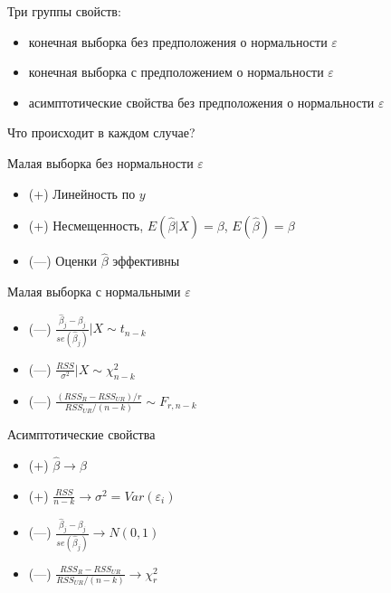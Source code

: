 \documentclass[ignorenonframetext,]{beamer}
\newcommand{\e}{\varepsilon}
\begin{document}
\begin{frame}{Три группы свойств:}

\begin{itemize}
\item
  конечная выборка без предположения о нормальности \(\varepsilon\)
\item
  конечная выборка с предположением о нормальности \(\varepsilon\)
\item
  асимптотические свойства без предположения о нормальности
  \(\varepsilon\)
\end{itemize}

Что происходит в каждом случае?

\end{frame}

\begin{frame}{Малая выборка без нормальности \(\varepsilon\)}

\begin{itemize}
\item
  (+) Линейность по \(y\)
\item
  (+) Несмещенность, \(E(\hat{\beta}|X)=\beta\),
  \(E(\hat{\beta})=\beta\)
\item
  (---) Оценки \(\hat{\beta}\) эффективны
\end{itemize}

\end{frame}

\begin{frame}{Малая выборка с нормальными \(\varepsilon\)}

\begin{itemize}
\item
  (---)
  \(\frac{\hat{\beta}_j-\beta_j}{se(\hat{\beta}_j)} | X \sim t_{n-k}\)
\item
  (---) \(\frac{RSS}{\sigma^2} |X \sim \chi^2_{n-k}\)
\item
  (---) \(\frac{(RSS_R-RSS_{UR})/r}{RSS_{UR}/(n-k)} \sim F_{r,n-k}\)
\end{itemize}

\end{frame}

\begin{frame}{Асимптотические свойства}

\begin{itemize}
\item
  (+) \(\hat{\beta} \to \beta\)
\item
  (+) \(\frac{RSS}{n-k} \to \sigma^2=Var(\e_i)\)
\item
  (---) \(\frac{\hat{\beta}_j-\beta_j}{se(\hat{\beta}_j)} \to N(0,1)\)
\item
  (---) \(\frac{RSS_R-RSS_{UR}}{RSS_{UR}/(n-k)} \to \chi^2_r\)
\end{itemize}

\end{frame}
\end{document}

